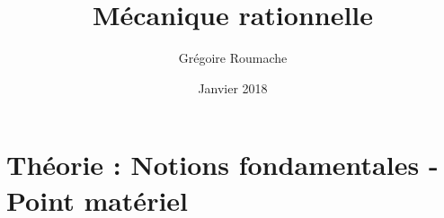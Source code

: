 \documentclass[a4paper]{article}
\title{Mécanique rationnelle}
\author{Grégoire Roumache}
\date{Janvier 2018}
\begin{document}
\maketitle
















\section{Théorie : Notions fondamentales - Point matériel}
\end{document}
